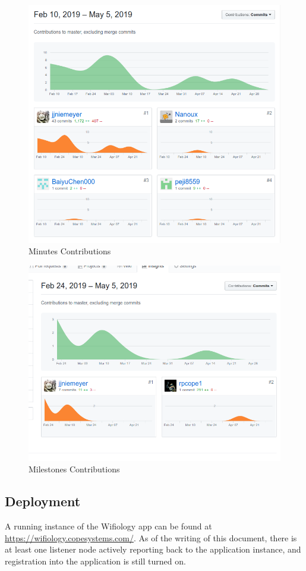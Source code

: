 \documentclass[]{article}
\begin{document}
	\begin{figure}[h]
	\label{fig:minutes_contrib}
	\includegraphics[width=1.0\textwidth]{minutesContrib}
	\caption{Minutes Contributions}
	\end{figure}
	
	\begin{figure}[h]
	\label{fig:milestones_contrib}
	\includegraphics[width=1.0\textwidth]{milestonesContrib}
	\caption{Milestones Contributions}
	\end{figure}
	
	\subsection{Deployment}
	
	A running instance of the Wifiology app can be found at \href{https://wifiology.copesystems.com/}{https://wifiology.copesystems.com/}.
	As of the writing of this document, there is at least one listener node actively reporting back to the application instance, and 
	registration into the application is still turned on.
	
\end{document}
